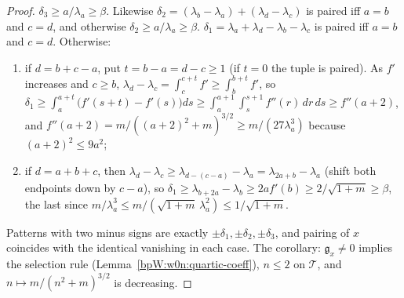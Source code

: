 \begin{proof}
$\delta_3\ge a/\lambda_a\ge\beta$. Likewise $\delta_2=(\lambda_b-\lambda_a)+(\lambda_d-\lambda_c)$ is paired iff
$a=b$ and $c=d$, and otherwise $\delta_2\ge a/\lambda_a\ge\beta$.
\label{stepW:w3:s1inner}
$\delta_1=\lambda_a+\lambda_d-\lambda_b-\lambda_c$ is paired iff $a=b$ and $c=d$. Otherwise:
\begin{enumerate}[label=(\roman*)]
\item if $d=b+c-a$, put $t=b-a=d-c\ge1$ (if $t=0$ the tuple is paired). As $f'$ increases and $c\ge b$,
  $\lambda_d-\lambda_c=\int_c^{c+t}f'\ge\int_b^{b+t}f'$, so
  $\delta_1\ge\int_a^{a+t}\bigl(f'(s+t)-f'(s)\bigr)ds\ge\int_a^{a+1}\int_s^{s+1}f''(r)\,dr\,ds\ge f''(a+2)$, and
  $f''(a+2)=m/((a+2)^2+m)^{3/2}\ge m/(27\lambda_a^3)$ because $(a+2)^2\le9a^2$;
\item if $d=a+b+c$, then $\lambda_d-\lambda_c\ge\lambda_{d-(c-a)}-\lambda_a=\lambda_{2a+b}-\lambda_a$ (shift both
  endpoints down by $c-a$), so $\delta_1\ge\lambda_{b+2a}-\lambda_b\ge2af'(b)\ge2/\sqrt{1+m}\ge\beta$, the last since
  $m/\lambda_a^3\le m/(\sqrt{1+m}\,\lambda_a^2)\le1/\sqrt{1+m}$.
\end{enumerate}
\label{stepW:w3:divconcl}
Patterns with two minus signs are exactly $\pm\delta_1,\pm\delta_2,\pm\delta_3$, and pairing of $x$ coincides with the
identical vanishing in each case. The corollary: $\mathfrak g_x\ne0$ implies the selection rule
(Lemma~\ref{bpW:w0n:quartic-coeff}), $n\le2$ on $\mathcal T$, and $n\mapsto m/(n^2+m)^{3/2}$ is decreasing.
\end{proof}

